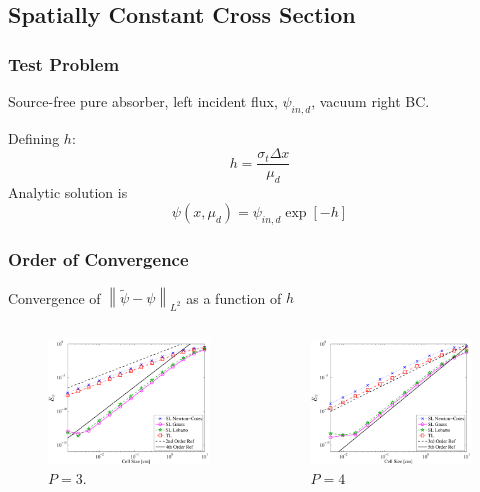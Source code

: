 \documentclass{beamer}
\newcommand{\be}{\begin{equation*}}   %
\newcommand{\ee}{\end{equation*}}
\newcommand{\norm}[1]{\ensuremath{\left\lVert #1 \right\rVert}}  %
\begin{document}
\appendix
\subsection{Spatially Constant Cross Section}

\begin{frame}
\frametitle{Test Problem}
Source-free pure absorber, left incident flux, $\psi_{in,d}$, vacuum right BC.

Defining $h$:
\be
h = \frac{\sigma_t \Delta x}{\mu_d}
\ee
Analytic solution is
\be
\psi(x,\mu_d) = \psi_{in,d} \exp[-h]
\ee

\end{frame}

\begin{frame}
\frametitle{Order of Convergence}
Convergence of $\norm{ \widetilde{\psi} - \psi }_{L^2}$ as a function of $h$ 
\begin{columns}[c]
\begin{figure}
\includegraphics[width=5.5cm]{../chapter2_constant_xs/Cubic_L2_err-eps-converted-to.pdf}
\caption{$P=3$.}
\end{figure}
\begin{figure}
\includegraphics[width=5.5cm]{../chapter2_constant_xs/Quartic_L2_err-eps-converted-to.pdf}
\caption{$P=4$}
\end{figure}
\end{columns}
\end{frame}
\end{document}
